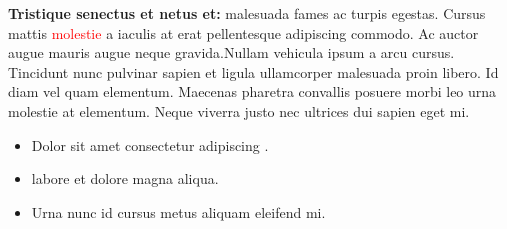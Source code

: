 {\bf Tristique senectus et netus et:} malesuada fames ac turpis egestas.
Cursus mattis \textcolor{red}{molestie} a iaculis at erat pellentesque adipiscing commodo. 
Ac auctor augue mauris augue neque gravida.Nullam vehicula ipsum a arcu cursus. 
Tincidunt nunc pulvinar sapien et ligula ullamcorper malesuada proin libero. 
Id diam vel quam elementum. Maecenas pharetra convallis posuere morbi leo urna molestie at elementum. 
Neque viverra justo nec ultrices dui sapien eget mi.
\begin{itemize}

\item Dolor sit amet consectetur adipiscing .
\item labore et dolore magna aliqua.
\item Urna nunc id cursus metus aliquam eleifend mi. 
\end{itemize}


% 
% 
% 
% 


% 


% 
